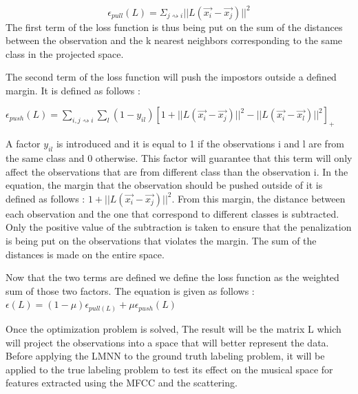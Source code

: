 \documentclass[hidelinks,12pt]{report}
\begin{document}
 $$\epsilon_{pull}(L)=\Sigma_{j \rightsquigarrow i}||L(\vec{x_i}-\vec{x_j})||^2$$
 The first term of the loss function is thus being put on the sum of the distances between the observation and the k nearest neighbors corresponding to the same class in the projected space.\par
The second term of the loss function will push the impostors outside a defined margin. It is defined as follows : \par 
$\epsilon_{push}(L)=\sum\limits_{i, j \rightsquigarrow i}\sum\limits_{l}(1-y_{il})[1+||L(\vec{x_i}-\vec{x_j})||^2-||L(\vec{x_i}-\vec{x_l})||^2]_+$ \par 
A factor $y_{il}$ is introduced and it is equal to 1 if the observations i and l are from the same class and 0 otherwise. This factor will guarantee that this term will only affect the observations that are from different class than the observation i. In the equation, the margin that the observation should be pushed outside of it is defined as follows : $1+||L(\vec{x_i}-\vec{x_j})||^2$. From this margin, the distance between each observation and the one that correspond to different classes is subtracted. Only the positive value of the subtraction is taken to ensure that the penalization is being put on the observations that violates the margin. The sum of the distances is made on the entire space.\par 
Now that the two terms are defined we define the loss function as the weighted sum of those two factors. The equation is given as follows : 
$\epsilon(L)=(1-\mu)\epsilon_{pull(L)}+\mu \epsilon_{push}(L) $

Once the optimization problem is solved, The result will be the matrix L which will project the observations into a space that will better represent the data. Before applying the LMNN to the ground truth labeling problem, it will be applied to the true labeling problem to test its effect on the musical space for features extracted using the MFCC and the scattering.
\end{document}
